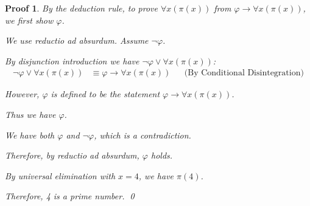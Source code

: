 \documentclass[12pt]{article}
\theoremstyle{proofstyle}
\newtheorem*{proof*}{Proof}
\let\oldquote\quote
\let\oldendquote\endquote
\renewenvironment{quote}
    {\oldquote\setlength{\parskip}{0.2em}}
    {\oldendquote}
\begin{document}
\begin{enumerate}[left=0pt, itemsep=2em, parsep=1em]
\begin{proof*}
    By the deduction rule, to prove $\forall x(\pi(x))$ from $\varphi \to \forall x(\pi(x))$, we first show $\varphi$.

    We use reductio ad absurdum.
    \begin{quote} Assume $\neg\varphi$.

    By disjunction introduction we have $\neg\varphi \vee \forall x(\pi(x))$:
    \begin{align*}
        \neg\varphi \vee \forall x(\pi(x)) &\equiv \varphi \to \forall x(\pi(x))  && \text{(By Conditional Disintegration)}
    \end{align*}
        
    However, $\varphi$ is defined to be the statement $\varphi \to \forall x(\pi(x))$.
    
    Thus we have $\varphi$.
    
    We have both $\varphi$ and $\neg\varphi$, which is a contradiction.

    \end{quote}
    
    Therefore, by reductio ad absurdum, $\varphi$ holds.
        
    By universal elimination with $x = 4$, we have $\pi(4)$.
    
    Therefore, 4 is a prime number. \qed
\end{proof*}

\end{enumerate}
\end{document}
